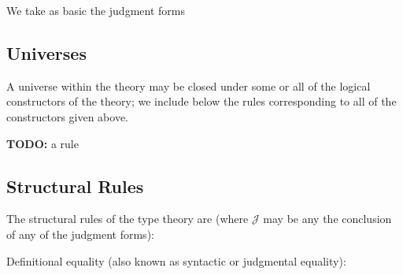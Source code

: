 We take as basic the judgment forms

\subsection*{Universes} \label{subsec:universe-rules}

A universe within the theory may be closed under some or all of the logical constructors of the theory; we include below the rules corresponding to all of the constructors given above.

\textbf{TODO:} a rule

\subsection*{Structural Rules} \label{subsec:structural-rules}

The structural rules of the type theory are (where $\mathcal{J}$ may be any the
conclusion of any of the judgment forms):


Definitional equality (also known as syntactic or judgmental equality):

